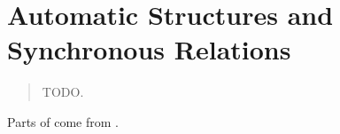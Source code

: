 \chapter{Automatic Structures and Synchronous Relations}
\label{ch:preliminaries-automatic-structures}

\begin{chapterpresentation}
	\begin{abstract}
		TODO.
	\end{abstract}
	\medskip
	\begin{acknowledgements}
		Parts of 
		come from \cite[\S~1]{Morvan2024Algebras}.
	\end{acknowledgements}
\end{chapterpresentation}
	
\chaptertoc



